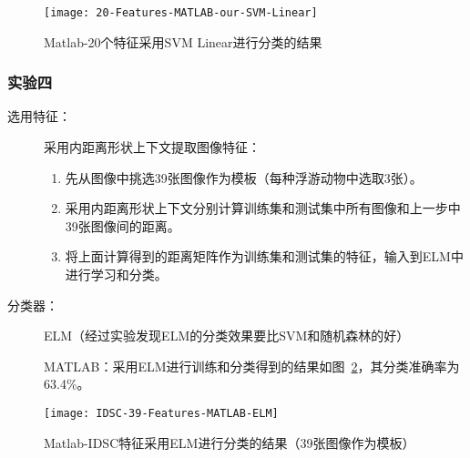 \begin{figure}[!ht]
\centering
\texttt{[image: 20-Features-MATLAB-our-SVM-Linear]}
\caption{Matlab-20个特征采用SVM Linear进行分类的结果}
\label{fig:20-Features-MATLAB-our-SVM-Linear}
\end{figure}

\subsubsection{实验四}
\label{shiyan4}
\begin{description}
\item[选用特征：] 采用内距离形状上下文提取图像特征：
    \begin{enumerate}
    \item 先从图像中挑选39张图像作为模板（每种浮游动物中选取3张）。
    \item 采用内距离形状上下文分别计算训练集和测试集中所有图像和上一步中39张图像间的距离。
    \item 将上面计算得到的距离矩阵作为训练集和测试集的特征，输入到ELM中进行学习和分类。
    \end{enumerate}
\item[分类器：] ELM（经过实验发现ELM的分类效果要比SVM和随机森林的好）

MATLAB：采用ELM进行训练和分类得到的结果如图~\ref{fig:IDSC-39-Features-MATLAB-ELM}，其分类准确率为63.4\%。
\end{description}
\begin{figure}[!ht]
\centering
\texttt{[image: IDSC-39-Features-MATLAB-ELM]}
\caption{Matlab-IDSC特征采用ELM进行分类的结果（39张图像作为模板）}
\label{fig:IDSC-39-Features-MATLAB-ELM}
\end{figure}

\begin{comment}
\subsubsection{实验五}
\begin{description}
\item[选用特征：] 采用内距离形状上下文提取图像特征。该实验在\ref{shiyan4}实验四的基础上，将39张图像模板增加到65张。
\item[分类器：] ELM

MATLAB：采用ELM进行训练和分类得到的结果如图~\ref{fig:IDSC-65-Features-MATLAB-ELM}，其分类准确率为63.4\%。
\end{description}
\begin{figure}[!ht]
\centering
\texttt{[image: IDSC-65-Features-MATLAB-ELM]}
\caption{Matlab-IDSC特征采用ELM进行分类的结果}
\label{fig:IDSC-65-Features-MATLAB-ELM}
\end{figure}

\begin{figure}[!ht]
\centering
\texttt{[image: 20-Features-MATLAB-our-SVM-Linear]}
\caption{Matlab-20个特征采用SVM Linear进行分类的结果}
\label{fig:20-Features-MATLAB-our-SVM-Linear}
\end{figure}
\end{comment}

